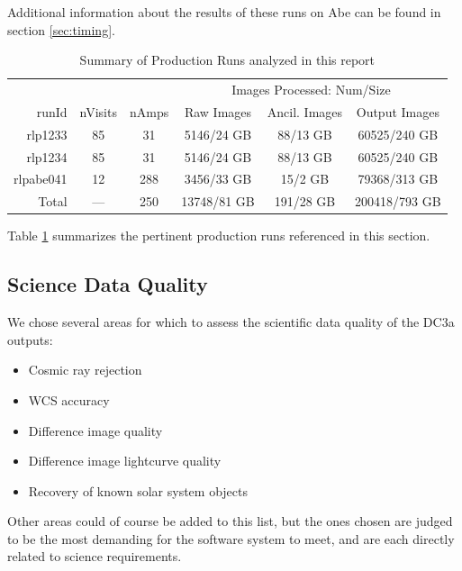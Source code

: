 \noindent Additional information about the results of these runs on
Abe can be found in section \ref{sec:timing}.  

\begin{table}[htbp]
\centering
\caption{Summary of Production Runs analyzed in this report
\label{tbl:runsummary}}
\vspace{\baselineskip}
\begin{tabular}{rccccc}
\hline\hline
          &         &       & \multicolumn{3}{c}{Images Processed: Num/Size} \\
runId     & nVisits & nAmps & Raw Images & Ancil. Images & Output Images \\ \hline
rlp1233   & 85      & 31  & 5146/24 GB    & 88/13 GB       & 60525/240 GB \\ 
rlp1234   & 85      & 31  & 5146/24 GB    & 88/13 GB       & 60525/240 GB \\ 
rlpabe041 & 12      & 288 & 3456/33 GB    & 15/2 GB        & 79368/313 GB \\ \hline
Total     & ---     & 250 & 13748/81 GB   & 191/28 GB      & 200418/793 GB \\ \hline
\end{tabular}
\end{table}

Table \ref{tbl:runsummary} summarizes the pertinent production runs
referenced in this section.


\subsection{Science Data Quality}
We chose several areas for which to assess the scientific data quality of the DC3a outputs:
\begin{itemize}
\item Cosmic ray rejection
\item WCS accuracy
\item Difference image quality
\item Difference image lightcurve quality
\item Recovery of known solar system objects
\end{itemize}
Other areas could of course be added to this list, but the ones chosen
are judged to be the most demanding for the software system to meet,
and are each directly related to science requirements. 
